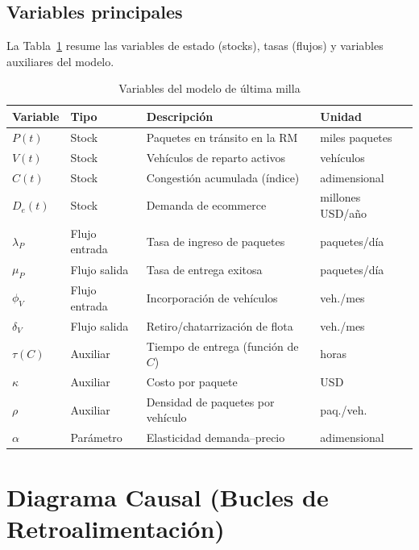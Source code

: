 \documentclass[12pt,a4paper]{article}
\begin{document}
\subsection{Variables principales}

La Tabla~\ref{tab:variables} resume las variables de estado (stocks),
tasas (flujos) y variables auxiliares del modelo.

\begin{table}[H]
\centering
\caption{Variables del modelo de última milla}
\label{tab:variables}
\begin{tabularx}{\textwidth}{@{}llXl@{}}
\toprule
\rowcolor{azulUCH!15}
\textbf{Variable} & \textbf{Tipo} & \textbf{Descripción} & \textbf{Unidad} \\
\midrule
$P(t)$ & Stock & Paquetes en tránsito en la RM & miles paquetes \\
$V(t)$ & Stock & Vehículos de reparto activos & vehículos \\
$C(t)$ & Stock & Congestión acumulada (índice) & adimensional \\
$D_e(t)$ & Stock & Demanda de ecommerce & millones USD/año \\
\midrule
$\lambda_P$ & Flujo entrada & Tasa de ingreso de paquetes & paquetes/día \\
$\mu_P$ & Flujo salida & Tasa de entrega exitosa & paquetes/día \\
$\phi_V$ & Flujo entrada & Incorporación de vehículos & veh./mes \\
$\delta_V$ & Flujo salida & Retiro/chatarrización de flota & veh./mes \\
\midrule
$\tau(C)$ & Auxiliar & Tiempo de entrega (función de $C$) & horas \\
$\kappa$ & Auxiliar & Costo por paquete & USD \\
$\rho$ & Auxiliar & Densidad de paquetes por vehículo & paq./veh. \\
$\alpha$ & Parámetro & Elasticidad demanda--precio & adimensional \\
\bottomrule
\end{tabularx}
\end{table}

\section{Diagrama Causal (Bucles de Retroalimentación)}
\end{document}
